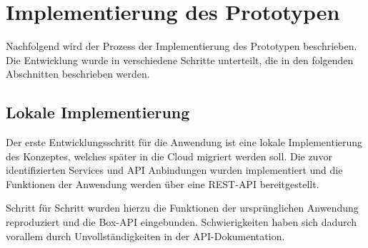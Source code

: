 \chapter{Implementierung des Prototypen}

Nachfolgend wird der Prozess der Implementierung des Prototypen beschrieben. Die Entwicklung wurde in verschiedene Schritte unterteilt, die in den folgenden Abschnitten beschrieben werden.

\section{Lokale Implementierung}
Der erste Entwicklungsschritt für die Anwendung ist eine lokale Implementierung des Konzeptes, welches später in die Cloud migriert werden soll. Die zuvor identifizierten Services und \ac{API} Anbindungen wurden implementiert und die Funktionen der Anwendung werden über eine \ac{REST}-\ac{API} bereitgestellt.

Schritt für Schritt wurden hierzu die Funktionen der ursprünglichen Anwendung reproduziert und die \gls{Box}-\ac{API} eingebunden. Schwierigkeiten haben sich dadurch vorallem durch Unvollständigkeiten in der \ac{API}-Dokumentation. \pagebreak




